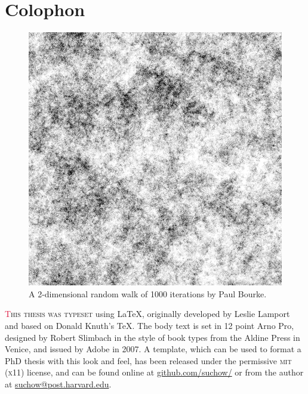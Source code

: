 \chapter*{Colophon}

\begin{figure}[h]
    \centering
  \includegraphics[width=0.50\linewidth]{figures/walk1000.jpg}
  \caption{A 2-dimensional random walk of 1000 iterations by Paul Bourke.}
  \label{fig:1000-iteration random walk}
\end{figure}

\begin{center}
\parbox{200pt}{\raggedright\lettrine[lines=3,slope=-2pt,nindent=-4pt]{\textcolor{Crimson}{T}}{his thesis was typeset} using \LaTeX, originally developed by Leslie Lamport and based on Donald Knuth's \TeX. The body text is set in 12 point Arno Pro, designed by Robert Slimbach in the style of book types from the Aldine Press in Venice, and issued by Adobe in 2007. A template, which can be used to format a PhD thesis with this look and feel, has been released under the permissive \textsc{mit} (\textsc{x}11) license, and can be found online at \href{https://github.com/suchow/}{github.com/suchow/} or from the author at \href{mailto:suchow@fas.harvard.edu}{suchow@post.harvard.edu}.
}
\end{center}